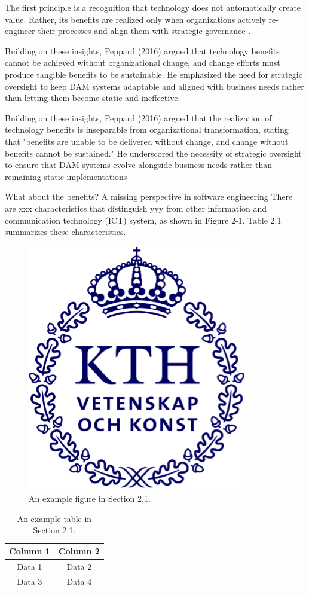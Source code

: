 \documentclass[a4paper,12pt,twocolumn]{article}
\numberwithin{figure}{section}
\numberwithin{table}{section}
\begin{document}
The first principle is a recognition that technology does not automatically create value. 
Rather, its benefits are realized only when organizations actively re-engineer their processes 
and align them with strategic governance \citep{LOVE2019102930}. 

Building on these insights, Peppard (2016) argued that technology benefits cannot be achieved 
without organizational change, and change efforts must produce tangible benefits to be sustainable. 
He emphasized the need for strategic oversight to keep DAM systems adaptable and aligned with business 
needs rather than letting them become static and ineffective\citep{LOVE2019102930}.


Building on these insights, Peppard (2016) argued that the realization of technology benefits 
is inseparable from organizational transformation, stating that "benefits are unable to be delivered 
without change, and change without benefits cannot be sustained."
He underscored the necessity of strategic oversight to ensure that DAM systems evolve alongside business needs rather than remaining static implementations





What about the benefits? A missing perspective in software engineering
There are xxx characteristics that distinguish yyy from other information and communication
technology (ICT) system, as shown in Figure 2-1. Table 2.1 summarizes these characteristics.

\begin{figure}[htbp]
    \centering
    \includegraphics[width=0.4\linewidth]{kthLogga.png}  %
    \caption{An example figure in Section 2.1.}
    \label{fig:lit_review}  
\end{figure}

\begin{table}[htbp]
    \centering
    \begin{tabular}{|c|c|}
        \hline
        Column 1 & Column 2 \\
        \hline
        Data 1 & Data 2 \\
        Data 3 & Data 4 \\
        \hline
    \end{tabular}
    \caption{An example table in Section 2.1.}
    \label{tab:lit_review}  
\end{table}
\end{document}
